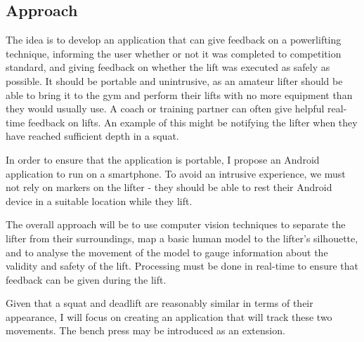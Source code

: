 \subsection{Approach}

The idea is to develop an application that can give feedback on a powerlifting technique, informing the user whether or not it was completed to competition standard, and giving feedback on whether the lift was executed as safely as possible. It should be portable and unintrusive, as an amateur lifter should be able to bring it to the gym and perform their lifts with no more equipment than they would usually use. A coach or training partner can often give helpful real-time feedback on lifts. An example of this might be notifying the lifter when they have reached sufficient depth in a squat.

In order to ensure that the application is portable, I propose an Android application to run on a smartphone. To avoid an intrusive experience, we must not rely on markers on the lifter - they should be able to rest their Android device in a suitable location while they lift.

The overall approach will be to use computer vision techniques to separate the lifter from their surroundings, map a basic human model to the lifter's silhouette, and to analyse the movement of the model to gauge information about the validity and safety of the lift. Processing must be done in real-time to ensure that feedback can be given during the lift.

Given that a squat and deadlift are reasonably similar in terms of their appearance, I will focus on creating an application that will track these two movements. The bench press may be introduced as an extension.